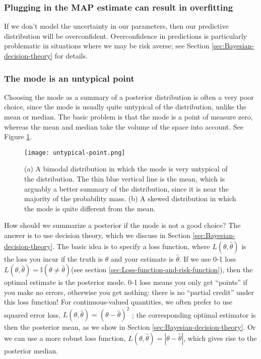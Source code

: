 \subsubsection{Plugging in the MAP estimate can result in overfitting}
If we don’t model the uncertainty in our parameters, then our predictive distribution will be overconfident. Overconfidence in predictions is particularly problematic in situations where we may be risk averse; see Section \ref{sec:Bayesian-decision-theory} for details.

\subsubsection{The mode is an untypical point}
Choosing the mode as a summary of a posterior distribution is often a very poor choice, since the mode is usually quite untypical of the distribution, unlike the mean or median. The basic problem is that the mode is a point of measure zero, whereas the mean and median take the volume of the space into account. See Figure \ref{fig:untypical-point}.

\begin{figure}[hbtp]
\centering
    \texttt{[image: untypical-point.png]}
\caption{(a) A bimodal distribution in which the mode is very untypical of the distribution. The thin blue vertical line is the mean, which is arguably a better summary of the distribution, since it is near the majority of the probability mass. (b) A skewed distribution in which the mode is quite different from the mean.}
\label{fig:untypical-point} 
\end{figure}

How should we summarize a posterior if the mode is not a good choice? The answer is to use decision theory, which we discuss in Section \ref{sec:Bayesian-decision-theory}. The basic idea is to specify a loss function, where $L(\theta,\hat{\theta})$ is the loss you incur if the truth is $\theta$ and your estimate is $\hat{\theta}$. If we use 0-1 loss $L(\theta,\hat{\theta})=\mathbb{I}(\theta \neq \hat{\theta})$(see section \ref{sec:Loss-function-and-risk-function}), then the optimal estimate is the posterior mode. 0-1 loss means you only get “points” if you make no errors, otherwise you get nothing: there is no “partial credit” under this loss function! For continuous-valued quantities, we often prefer to use squared error loss, $L(\theta,\hat{\theta})=(\theta-\hat{\theta})^2$ ; the corresponding optimal estimator is then the posterior mean, as we show in Section \ref{sec:Bayesian-decision-theory}. Or we can use a more robust loss function, $L(\theta,\hat{\theta})=|\theta-\hat{\theta}|$, which gives rise to the posterior median.


